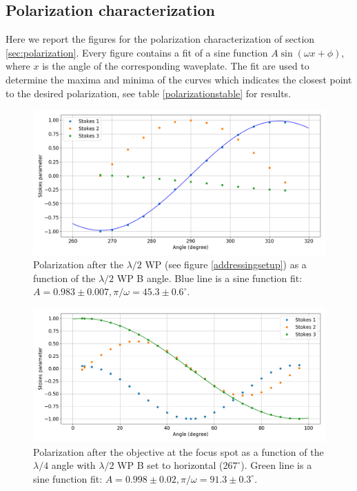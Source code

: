 \documentclass[english, a4paper, 12pt, twoside]{book}
\numberwithin{equation}{section} %
\begin{document}
\begin{appendices}
\chapter{Polarization characterization}
\label{app:polarization}
Here we report the figures for the polarization characterization of section \ref{sec:polarization}. Every figure contains a fit of a sine function $A\sin(\omega x +\phi)$, where $x$ is the angle of the corresponding waveplate. The fit are used to determine the maxima and minima of the curves which indicates the closest point to the desired polarization, see table \ref{polarizationstable} for results.
\begin{figure}[H]
\centering
\includegraphics[width = \textwidth]{pol3}
\caption{Polarization after the $\lambda/2$ WP (see figure \ref{addressingsetup}) as a function of the $\lambda/2$ WP B angle. Blue line is a sine function fit: $A = 0.983 \pm 0.007, \pi/\omega = 45.3 \pm 0.6^\circ$.}
\label{pol1}
\end{figure}
\begin{figure}[H]
\centering
\includegraphics[width = \textwidth]{pol1}
\caption{Polarization after the objective at the focus spot as a function of the $\lambda/4$ angle with $\lambda/2$ WP B set to horizontal ($267^\circ$). Green line is a sine function fit: $A = 0.998\pm 0.02, \pi/\omega = 91.3\pm0.3^\circ$.}

\end{figure}
\end{appendices}
\end{document}
